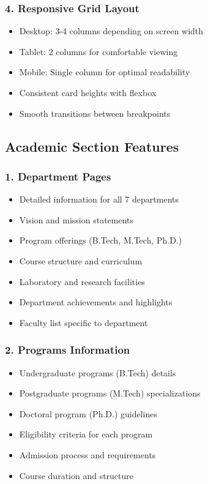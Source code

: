 \documentclass[12pt,a4paper]{report}
\begin{document}
\subsubsection*{4. Responsive Grid Layout}
\begin{itemize}
    \item Desktop: 3-4 columns depending on screen width
    \item Tablet: 2 columns for comfortable viewing
    \item Mobile: Single column for optimal readability
    \item Consistent card heights with flexbox
    \item Smooth transitions between breakpoints
\end{itemize}

\subsection{Academic Section Features}

\subsubsection*{1. Department Pages}
\begin{itemize}
    \item Detailed information for all 7 departments
    \item Vision and mission statements
    \item Program offerings (B.Tech, M.Tech, Ph.D.)
    \item Course structure and curriculum
    \item Laboratory and research facilities
    \item Department achievements and highlights
    \item Faculty list specific to department
\end{itemize}

\subsubsection*{2. Programs Information}
\begin{itemize}
    \item Undergraduate programs (B.Tech) details
    \item Postgraduate programs (M.Tech) specializations
    \item Doctoral program (Ph.D.) guidelines
    \item Eligibility criteria for each program
    \item Admission process and requirements
    \item Course duration and structure
\end{itemize}
\end{document}
